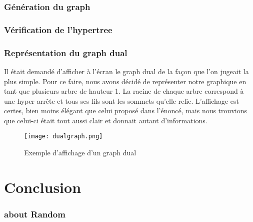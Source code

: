 \documentclass[a4paper]{report}
\begin{document}
\section{Génération du graph}
\section{Vérification de l'hypertree}
\section{Représentation du graph dual}
Il était demandé d'afficher à l'écran le graph dual de la façon que l'on jugeait la plus simple. Pour ce faire, nous avons décidé de représenter notre graphique en tant que plusieurs arbre de hauteur 1. La racine de chaque arbre correspond à une hyper arrête et tous ses fils sont les sommets qu'elle relie. L'affichage est certes, bien moins élégant que celui proposé dans l'énoncé, mais nous trouvions que celui-ci était tout aussi clair et donnait autant d'informations.
\begin{figure}[!h]
\begin{center}
\texttt{[image: dualgraph.png]}
\caption{Exemple d'affichage d'un graph dual}
\end{center}
\end{figure}
\part{Conclusion}
\section{about Random}



\end{document}
